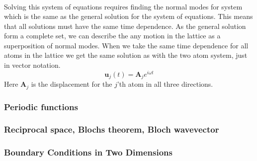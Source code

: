 \begin{align}
\end{align}Solving this system of equations requires finding the normal modes for system which is the same as the general solution for the system of equations. This means that all solutions must have the same time dependence. As the general solution form a complete set, we can describe the any motion in the lattice as a superposition of normal modes. When we take the same time dependence for all atoms in the lattice we get the same solution as with the two atom system, just in vector notation.\begin{equation}
    \mathbf{u}_{j}(t)=\mathbf{A}_{j}e^{i\omega t}
\end{equation}Here $\mathbf{A}_{j}$ is the displacement for the $j$'th atom in all three directions. 

\subsubsection{Periodic functions}
\subsubsection{Reciprocal space, Blochs theorem, Bloch wavevector}

\subsubsection{Boundary Conditions in Two Dimensions}

